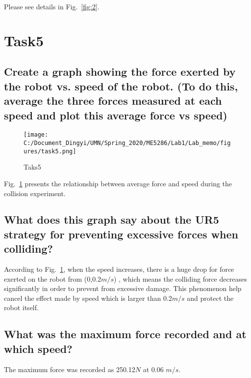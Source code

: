 \documentclass[letterpaper,11pt]{texMemo} %
\begin{document}
Please see details in Fig.~\ref{fig:2}.

\cleardoublepage

\section{Task5}

\subsection{Create a graph showing the force exerted by the robot vs. speed of the robot. (To do this, average the three forces measured at each speed and plot this average force vs speed)}

\begin{figure}[H]
	\centering
	\texttt{[image: C:/Document\_Dingyi/UMN/Spring\_2020/ME5286/Lab1/Lab\_memo/figures/task5.png]}
	\caption{Taks5}
	\label{fig:3}
\end{figure} 	

Fig.~\ref{fig:3} presents the relationship between average force and speed during the collision experiment.



\subsection{What does this graph say about the UR5 strategy for preventing excessive forces when colliding?}

According to Fig.~\ref{fig:3}, when the speed increases, there is a huge drop for force exerted on the robot from (0,0.2$m/s$) , which means the colliding force decreases significantly in order to prevent from excessive damage. This phenomenon help cancel the effect made by speed which is larger than 0.2$m/s$ and protect the robot itself.


\subsection{What was the maximum force recorded and at which speed?}

The maximum force was recorded as 250.12$N$ at 0.06 $m/s$.




\end{document}

